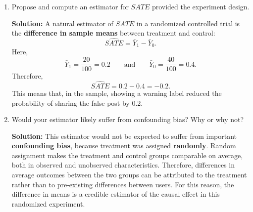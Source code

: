 \documentclass[11pt]{exam}
\begin{document}
\begin{questions}
\begin{enumerate}[leftmargin = 0.5cm, label = (\alph*), rightmargin = 0.2cm]
    \begin{solutionorbox}[7.8cm]
    \textbf{Solution:} \begin{itemize}[leftmargin = 0.6cm]
        \item The average treatment effect is
        \[
        ATE = \mathbb{E}[Y(1)-Y(0)],
        \]
        that is, the average causal effect in the population of interest.
        
        \item The sample average treatment effect is
        \[
        SATE = \frac{1}{n}\sum_{i=1}^n \bigl(Y_i(1)-Y_i(0)\bigr),
        \]
        that is, the average causal effect for the individuals in our sample.
    \end{itemize}
    While $ATE$ is the average treatment effect in the population, $SATE$ is the average treatment effect for the units in our sample. If the sample is representative of the population, then $SATE$ can be used to approximate or learn about $ATE$.
    \end{solutionorbox}
    
    \item Propose and compute an estimator for $SATE$ provided the experiment design.

    \begin{solutionorbox}[7cm]
    \textbf{Solution:} A natural estimator of $SATE$ in a randomized controlled trial is the \textbf{difference in sample means} between treatment and control:
    \[
    \widehat{SATE}=\bar Y_1-\bar Y_0.
    \]
    Here,
    \[
    \bar Y_1=\frac{20}{100}=0.2
    \qquad \text{and} \qquad
    \bar Y_0=\frac{40}{100}=0.4.
    \]
    Therefore,
    \[
    \widehat{SATE}=0.2-0.4=-0.2.
    \]
    This means that, in the sample, showing a warning label reduced the probability of sharing the false post by $0.2$.
    \end{solutionorbox}

    \item Would your estimator likely suffer from confounding bias? Why or why not?

    \begin{solutionorbox}[7.5cm]
    \textbf{Solution:} This estimator would not be expected to suffer from important \textbf{confounding bias}, because treatment was assigned \textbf{randomly}. Random assignment makes the treatment and control groups comparable on average, both in observed and unobserved characteristics. Therefore, differences in average outcomes between the two groups can be attributed to the treatment rather than to pre-existing differences between users. For this reason, the difference in means is a credible estimator of the causal effect in this randomized experiment.
    \end{solutionorbox}

\end{enumerate}

\end{questions}
\end{document}
